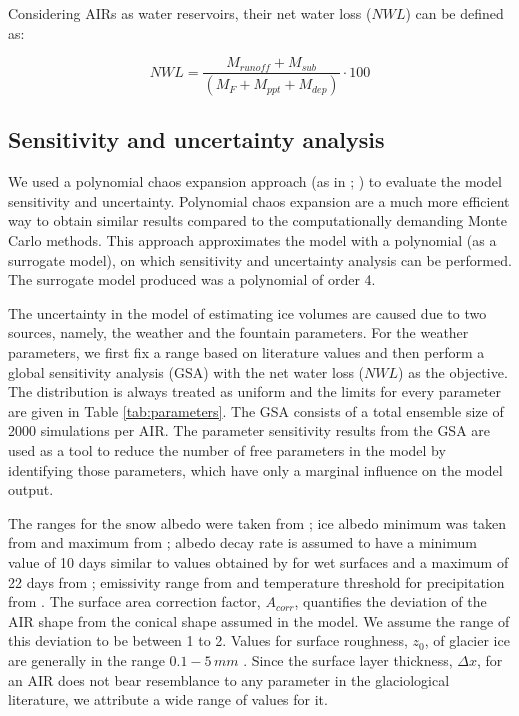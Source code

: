 \documentclass[utf8]{frontiersSCNS}
\begin{document}
Considering AIRs as water reservoirs, their net water loss ($NWL$) can be defined as:

\begin{equation} \textit{NWL} = \frac{M_{runoff}+M_{sub}}{(M_F+M_{ppt}+M_{dep})} \cdot 100 \end{equation}

\subsection{Sensitivity and uncertainty analysis}

We used a polynomial chaos expansion approach (as in \cite{uncertainpy_2018}; \cite{Xiu_2005}) to evaluate the
model sensitivity and uncertainty. Polynomial chaos expansion are a much more efficient way to obtain similar
results compared to the computationally demanding Monte Carlo methods. This approach approximates the model with a
polynomial (as a surrogate model), on which sensitivity and uncertainty analysis can be performed.  The surrogate
model produced was a polynomial of order 4.

The uncertainty in the model of estimating ice volumes are caused due to two sources, namely, the weather
and the fountain parameters. For the weather parameters, we first fix a range based on literature values
and then perform a global sensitivity analysis (GSA) with the net water loss ($NWL$) as the objective. The
distribution is always treated as uniform and the limits for every parameter are given in Table
\ref{tab:parameters}. The GSA consists of a total ensemble size of 2000 simulations per AIR. The parameter
sensitivity results from the GSA are used as a tool to reduce the number of free parameters in the model by
identifying those parameters, which have only a marginal influence on the model output.

The ranges for the snow albedo were taken from \cite{ZollesMaussion_2019}; ice albedo minimum was taken from
\cite{steiner_2015} and maximum from \cite{ZollesMaussion_2019}; albedo decay rate is assumed to have a minimum
value of 10 days similar to values obtained by \cite{Schmidt_2017} for wet surfaces and a maximum of 22 days from
\cite{OerlemansKnap_1998}; emissivity range from \cite{steiner_2015} and temperature threshold for precipitation
from \cite{Zhou_2010}. The surface area correction factor, $A_{corr}$, quantifies the deviation of the AIR shape
from the conical shape assumed in the model. We assume the range of this deviation to be between 1 to 2. Values for
surface roughness, $z_{0}$, of glacier ice are generally in the range $0.1-5\, mm$ \citep{BrockWillisSharp_2006}.
Since the surface layer thickness, $\Delta x$, for an AIR does not bear resemblance to any parameter in the
glaciological literature, we attribute a wide range of values for it.
\end{document}
